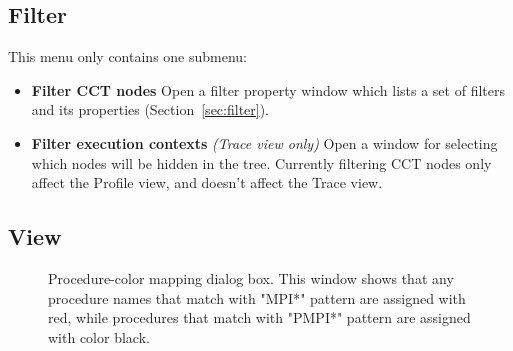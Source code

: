 
\subsection{Filter}
This menu only contains one submenu:
\begin{itemize}
 \item \textbf{Filter CCT nodes}
  Open a filter property window which lists a set of filters and its properties (Section~\ref{sec:filter}).

 \item \textbf{Filter execution contexts} \textit{(Trace view only)}
  Open a window for selecting which nodes will be hidden in the tree.
  Currently filtering CCT nodes only affect the Profile view, and doesn't affect the Trace view.

\end{itemize}


\subsection{View}

\begin{figure}[t]
\caption{Procedure-color mapping dialog box. This window shows that any procedure names that match with "MPI*" pattern are assigned with red, while procedures that match with "PMPI*" pattern are assigned with color black.}
\label{fig:hpctraceviewer-mapping}
\end{figure}


